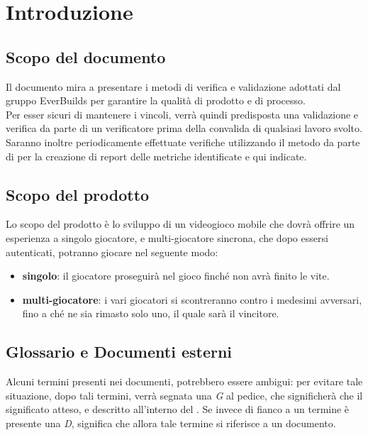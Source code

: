 \section{Introduzione}
	\subsection{Scopo del documento}
		Il documento mira a presentare i metodi di verifica e validazione adottati dal gruppo EverBuilds per garantire la qualità di prodotto e di processo. \\
		Per esser sicuri di mantenere i vincoli, verrà quindi predisposta una validazione e verifica da parte di un verificatore prima della convalida di qualsiasi lavoro svolto. \\
		Saranno inoltre periodicamente effettuate verifiche utilizzando il metodo  da parte di  per la creazione di report delle metriche identificate e qui indicate. \\
	\subsection{Scopo del prodotto}
		Lo scopo del prodotto è lo sviluppo di un videogioco mobile che dovrà offrire un esperienza a singolo giocatore, e multi-giocatore sincrona, che dopo essersi autenticati, potranno giocare nel seguente modo:
		\begin{itemize}
			\item \textbf{singolo}:
				il giocatore proseguirà nel gioco finché non avrà finito le vite.
			\item \textbf{multi-giocatore}:
				i vari giocatori si scontreranno contro i medesimi avversari, fino a ché ne sia rimasto solo uno, il quale sarà il vincitore.
		\end{itemize}
		
		
		
	\subsection{Glossario e Documenti esterni}
		Alcuni termini presenti nei documenti, potrebbero essere ambigui: per evitare tale situazione, dopo tali termini, verrà segnata una \textit{G} al pedice, che significherà che il significato atteso, e descritto all'interno del .
		Se invece di fianco a un termine è presente una  \textit{D}, significa che allora tale termine si riferisce a un documento.
		
